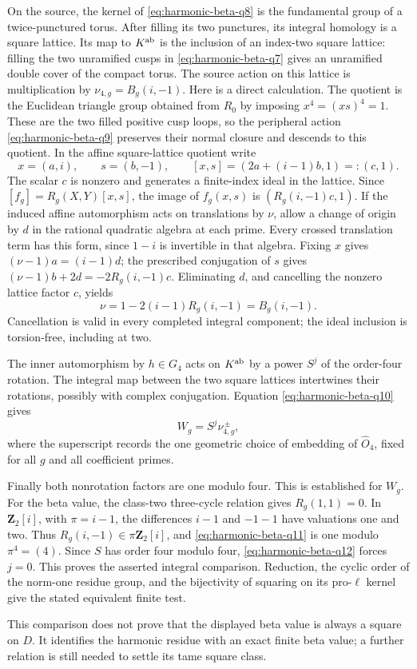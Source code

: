 On the source, the kernel of \eqref{eq:harmonic-beta-q8} is the fundamental group
of a twice-punctured torus. After filling its two punctures,
its integral homology is a square lattice. Its map to
\(K^{\rm ab}\) is the inclusion of an index-two square
lattice: filling the two unramified cusps in \eqref{eq:harmonic-beta-q7} gives an
unramified double cover of the compact torus.
The source action on this lattice is multiplication by
\(\nu_{4,g}=B_g(i,-1)\). Here is a direct calculation.
The quotient is the Euclidean triangle group obtained from
\(R_0\) by imposing \(x^4=(xs)^4=1\). These are the two
filled positive cusp loops, so the peripheral action \eqref{eq:harmonic-beta-q9}
preserves their normal closure and descends to this quotient.
In the affine square-lattice quotient write
\[
 x=(a,i),\qquad s=(b,-1),\qquad
 [x,s]=(2a+(i-1)b,1)=:(c,1).
\]
The scalar \(c\) is nonzero and generates a finite-index
ideal in the lattice. Since
\([f_g]=R_g(X,Y)[x,s]\), the image of \(f_g(x,s)\) is
\((R_g(i,-1)c,1)\). If the induced affine automorphism
acts on translations by \(\nu\), allow a change of origin
by \(d\) in the rational quadratic algebra at each prime.
Every crossed translation term has this form, since
\(1-i\) is invertible in that algebra. Fixing \(x\) gives
\((\nu-1)a=(i-1)d\); the prescribed conjugation of \(s\)
gives \((\nu-1)b+2d=-2R_g(i,-1)c\).
Eliminating \(d\), and cancelling the nonzero lattice
factor \(c\), yields
\begin{equation}
               \nu=1-2(i-1)R_g(i,-1)=B_g(i,-1).             \label{eq:harmonic-beta-q11}
\end{equation}
Cancellation is valid in every completed integral component;
the ideal inclusion is torsion-free, including at two.

The inner automorphism by \(h\in G_4\) acts on
\(K^{\rm ab}\) by a power \(S^j\) of the order-four rotation.
The integral map between the two square lattices
intertwines their rotations, possibly with complex
conjugation. Equation \eqref{eq:harmonic-beta-q10} gives
\begin{equation}
                     W_g=S^j\nu_{4,g}^{\,\pm},              \label{eq:harmonic-beta-q12}
\end{equation}
where the superscript records the one geometric choice of embedding of
\(\widehat O_4\), fixed for all \(g\) and all coefficient primes.

Finally both nonrotation factors are one modulo four.
This is established for \(W_g\). For the beta value, the
class-two three-cycle relation gives \(R_g(1,1)=0\).
In \(\mathbf Z_2[i]\), with \(\pi=i-1\), the differences
\(i-1\) and \(-1-1\) have valuations one and two.
Thus \(R_g(i,-1)\in\pi\mathbf Z_2[i]\), and \eqref{eq:harmonic-beta-q11} is
one modulo \(\pi^4=(4)\). Since \(S\) has order four
modulo four, \eqref{eq:harmonic-beta-q12} forces \(j=0\).
This proves the asserted integral comparison. Reduction,
the cyclic order of the norm-one residue group, and the
bijectivity of squaring on its pro-\(\ell\) kernel give
the stated equivalent finite test.

This comparison does not prove that the displayed beta
value is always a square on \(D\). It identifies the
harmonic residue with an exact finite beta value; a further
relation is still needed to settle its tame square class.
